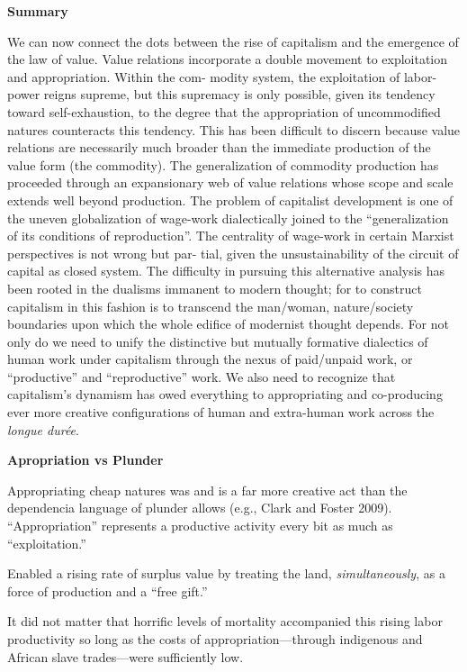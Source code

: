 \documentclass[
]{book}
\begin{document}
\textbf{Summary}

We can now connect the dots between the rise of capitalism and
the emergence of the law of value. Value relations incorporate a
double movement to exploitation and appropriation. Within the com-
modity system, the exploitation of labor-power reigns supreme, but
this supremacy is only possible, given its tendency toward
self-exhaustion, to the degree that the appropriation of uncommodified natures
counteracts this tendency. This has been difficult to discern because
value relations are necessarily much broader than the immediate
production of the value form (the commodity). The generalization of
commodity production has proceeded through an expansionary web
of value relations whose scope and scale extends well beyond production.
The problem of capitalist development is one of the uneven
globalization of wage-work dialectically joined to the ``generalization of
its conditions of reproduction''. The centrality of wage-work
in certain Marxist perspectives is not wrong but par-
tial, given the unsustainability of the circuit of capital as closed system.
The difficulty in pursuing this alternative analysis has been
rooted in the dualisms immanent to modern thought; for to construct
capitalism in this fashion is to transcend the man/woman,
nature/society boundaries upon which the whole edifice of modernist
thought depends. For not
only do we need to unify the distinctive but mutually formative
dialectics of human work under capitalism through the nexus of
paid/unpaid work, or ``productive'' and ``reproductive'' work. We also
need to recognize that capitalism's dynamism has owed everything to
appropriating and co-producing ever more creative configurations of
human and extra-human work across the \emph{longue durée}.

\textbf{Apropriation vs Plunder}

Appropriating cheap natures was and is a far more creative act
than the dependencia language of plunder allows (e.g., Clark and
Foster 2009). ``Appropriation'' represents a productive activity every
bit as much as ``exploitation.''

Enabled a rising rate of surplus
value by treating the land, \emph{simultaneously}, as a force of production and
a ``free gift.''

It did not matter that horrific levels of mortality accompanied
this rising labor productivity so long as the costs of
appropriation---through indigenous and African slave trades---were
sufficiently low.
\end{document}
